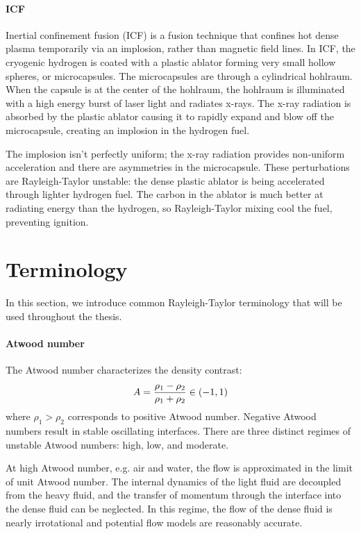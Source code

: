 \paragraph{ICF}
Inertial confinement fusion (ICF) is a fusion technique that confines hot dense plasma temporarily via an implosion, rather than magnetic field lines.
In ICF, the cryogenic hydrogen is coated with a plastic ablator forming very small hollow spheres, or microcapsules.
The microcapsules are through a cylindrical hohlraum.
When the capsule is at the center of the hohlraum, the hohlraum is illuminated with a high energy burst of laser light and radiates x-rays.
The x-ray radiation is absorbed by the plastic ablator causing it to rapidly expand and blow off the microcapsule, creating an implosion in the hydrogen fuel.

The implosion isn't perfectly uniform; the x-ray radiation provides non-uniform acceleration and there are asymmetries in the microcapsule.
These perturbations are Rayleigh-Taylor unstable: the dense plastic ablator is being accelerated through lighter hydrogen fuel.
The carbon in the ablator is much better at radiating energy than the hydrogen, so Rayleigh-Taylor mixing cool the fuel, preventing ignition.

\section{Terminology}

In this section, we introduce common Rayleigh-Taylor terminology that will be used throughout the thesis.

\paragraph{Atwood number}
The Atwood number characterizes the density contrast:
\begin{equation} \elabel{atwood}
A = \frac{\rho_1 - \rho_2}{\rho_1 + \rho_2} \in (-1,1)
\end{equation}
where $\rho_1 > \rho_2$ corresponds to positive Atwood number.
Negative Atwood numbers result in stable oscillating interfaces.
There are three distinct regimes of unstable Atwood numbers: high, low, and moderate.

At high Atwood number, e.g. air and water, the flow is approximated in the limit of unit Atwood number.
The internal dynamics of the light fluid are decoupled from the heavy fluid, and the transfer of momentum through the interface into the dense fluid can be neglected.
In this regime, the flow of the dense fluid is nearly irrotational and potential flow models are reasonably accurate.

